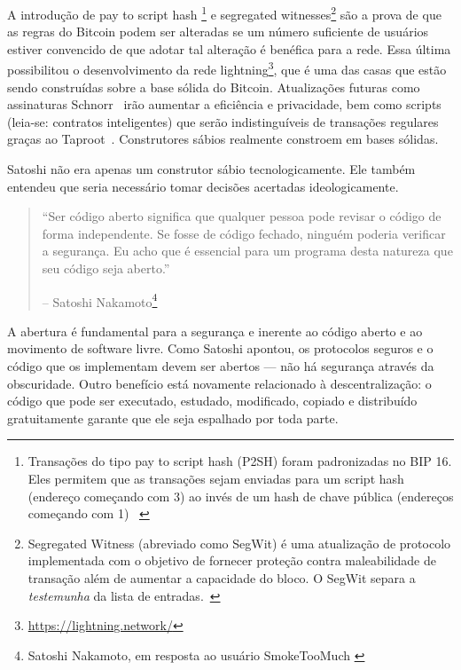 A introdução de pay to script hash \footnote{Transações do tipo pay to script hash (P2SH) foram padronizadas no BIP 16. Eles permitem que as transações sejam enviadas para um script hash (endereço começando com 3) ao invés de um hash de chave pública (endereços começando com 1) ~\cite{btcwiki:p2sh}} e segregated witnesses\footnote{Segregated Witness (abreviado como SegWit) é uma atualização de protocolo implementada com o objetivo de fornecer proteção contra maleabilidade de transação além de aumentar a capacidade do bloco. O SegWit separa a \textit{testemunha} da lista de entradas.~\cite{btcwiki:segwit}} são a prova de que as regras do Bitcoin podem ser alteradas se um número suficiente de usuários estiver convencido de que adotar tal alteração é benéfica para a rede. Essa última possibilitou o desenvolvimento da rede lightning\footnote{\url{https://lightning.network/}}, que é uma das casas que estão sendo construídas sobre a base sólida do Bitcoin. Atualizações futuras como assinaturas Schnorr~\cite{bip:schnorr} irão aumentar a eficiência e privacidade, bem como scripts (leia-se: contratos inteligentes) que serão indistinguíveis de transações regulares graças ao Taproot~\cite{taproot}. Construtores sábios realmente constroem em bases sólidas.

Satoshi não era apenas um construtor sábio tecnologicamente. Ele também entendeu que seria necessário tomar decisões acertadas ideologicamente.

\begin{quotation}\begin{samepage}
\enquote{Ser código aberto significa que qualquer pessoa pode revisar o código de forma independente. Se fosse de código fechado, ninguém poderia verificar a segurança. Eu acho que é essencial para um programa desta natureza que seu código seja aberto.}
\begin{flushright} -- Satoshi Nakamoto\footnote{Satoshi Nakamoto, em resposta ao usuário SmokeTooMuch \cite{satoshi-open-source}}
\end{flushright}\end{samepage}\end{quotation}

A abertura é fundamental para a segurança e inerente ao código aberto e ao movimento de software livre. Como Satoshi apontou, os protocolos seguros e o código que os implementam devem ser abertos --- não há segurança através da obscuridade. Outro benefício está novamente relacionado à descentralização: o código que pode ser executado, estudado, modificado, copiado e distribuído gratuitamente garante que ele seja espalhado por toda parte.

